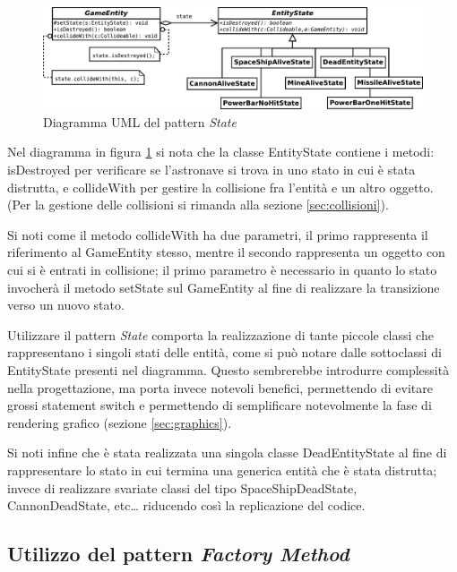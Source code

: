 \documentclass[a4paper,12pt]{article}
\begin{document}
\begin{figure}[h]
\centering
\includegraphics[width=15cm]{State.pdf}
\caption{Diagramma UML del pattern \emph{State}}
\label{img:State}
\end{figure}

Nel diagramma in figura \ref{img:State} si nota che la classe \textsf{EntityState} contiene i metodi: \textsf{isDestroyed} per verificare se l'astronave si trova in uno stato in cui \`e stata distrutta, e \textsf{collideWith} per gestire la collisione fra l'entit\`a e un altro oggetto. (Per la gestione delle collisioni si rimanda alla sezione \ref{sec:collisioni}).

Si noti come il metodo \textsf{collideWith} ha due parametri, il primo rappresenta il riferimento al \textsf{GameEntity} stesso, mentre il secondo rappresenta un oggetto con cui si \`e entrati in collisione; il primo parametro \`e necessario in quanto lo stato invocher\`a il metodo \textsf{setState} sul \textsf{GameEntity} al fine di realizzare la transizione verso un nuovo stato.

Utilizzare il pattern \emph{State} comporta la realizzazione di tante piccole classi che rappresentano i singoli stati delle entit\`a, come si pu\`o notare dalle sottoclassi di \textsf{EntityState} presenti nel diagramma. Questo sembrerebbe introdurre complessit\`a nella progettazione, ma porta invece notevoli benefici, permettendo di evitare grossi statement switch e permettendo di semplificare notevolmente la fase di rendering grafico (sezione \ref{sec:graphics}).

Si noti infine che \`e stata realizzata una singola classe \textsf{DeadEntityState} al fine di rappresentare lo stato in cui termina una generica entit\`a che \`e stata distrutta; invece di realizzare svariate classi del tipo \textsf{SpaceShipDeadState}, \textsf{CannonDeadState}, etc\dots{} riducendo cos\`i la replicazione del codice.

\subsection{Utilizzo del pattern \emph{Factory Method}}
\end{document}
